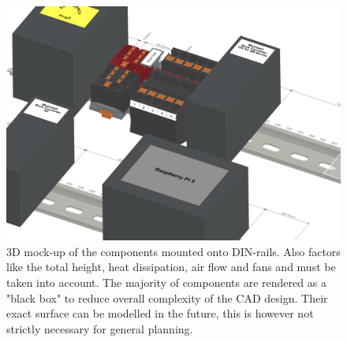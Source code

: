     \begin{figure}[h!] %
        \vspace{1cm}
        \includegraphics[width=1\linewidth]{contents/figures/diagonal-view_rails.png}
        \caption{3D mock-up of the components mounted onto DIN-rails. Also factors like the total height, heat dissipation, air flow and fans and must be taken into account. The majority of components are rendered as a "black box" to reduce overall complexity of the CAD design. Their exact surface can be modelled in the future, this is however not strictly necessary for general planning.}
        \label{diagonal-cad}
    \end{figure}

    








